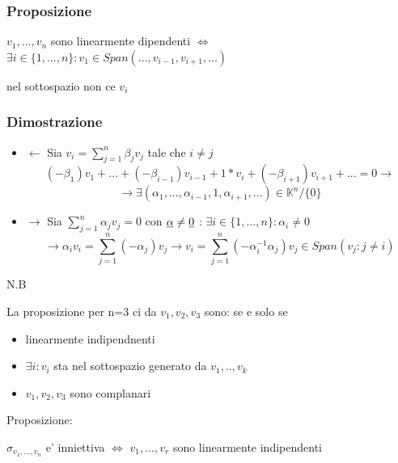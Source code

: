 \documentclass{article}
\begin{document}
\subsubsection*{Proposizione}
\begin{flushleft}
	$v_1,...,v_n$ sono linearmente dipendenti $\iff$ $\exists i \in \{1,...,n\}:v_1 \in Span(...,v_{i-1},v_{i+1},...)$
\end{flushleft}
\begin{flushleft}
	nel sottospazio non ce $v_i$
\end{flushleft}
\subsubsection*{Dimostrazione}
\begin{itemize}
	\item $\leftarrow$ Sia $v_i = \sum_{j=1}^n \beta_j v_j$ tale che $i \neq j$
	      \begin{equation*}
		      (-\beta_1)v_1+...+(-\beta_{i-1})v_{i-1}+1*v_i+(-\beta_{i+1})v_{i+1}+...=0 \to
	      \end{equation*}
	      \begin{equation*}
		      \to \exists (\alpha_{1},...,\alpha_{i-1},1,\alpha_{i+1},...) \in \mathbb{K}^n / \{\underbar{0} \}
	      \end{equation*}
	\item $\rightarrow$ Sia $\sum_{j=1}^n \alpha_j v_j = 0$ con $\underbar{$\alpha$} \neq \underbar{0}$ : $\exists i\in \{1,...,n\}:\alpha_i \neq 0$
	      \begin{equation*}
		      \to \alpha_i v_i = \sum_{j=1}^n (-\alpha_j)v_j \to v_i = \sum_{j=1}^n (-\alpha^{-1}_i \alpha_j)v_j\in Span(v_j:j\neq i)
	      \end{equation*}
\end{itemize}
N.B
\begin{flushleft}
	La proposizione per n=3  ci da $v_1,v_2,v_3$ sono: se e solo se
\end{flushleft}
\begin{itemize}
	\item linearmente indipendnenti
	\item $\exists i : v_i $ sta nel sottospazio generato da $v_1,..,v_k$
	\item $v_1,v_2,v_3$ sono complanari
\end{itemize}
Proposizione:
\begin{flushleft}
	$\sigma_{v_1,...,v_n}$ e' inniettiva $\iff$ $v_1,...,v_r$ sono linearmente indipendenti
\end{flushleft}
\end{document}
